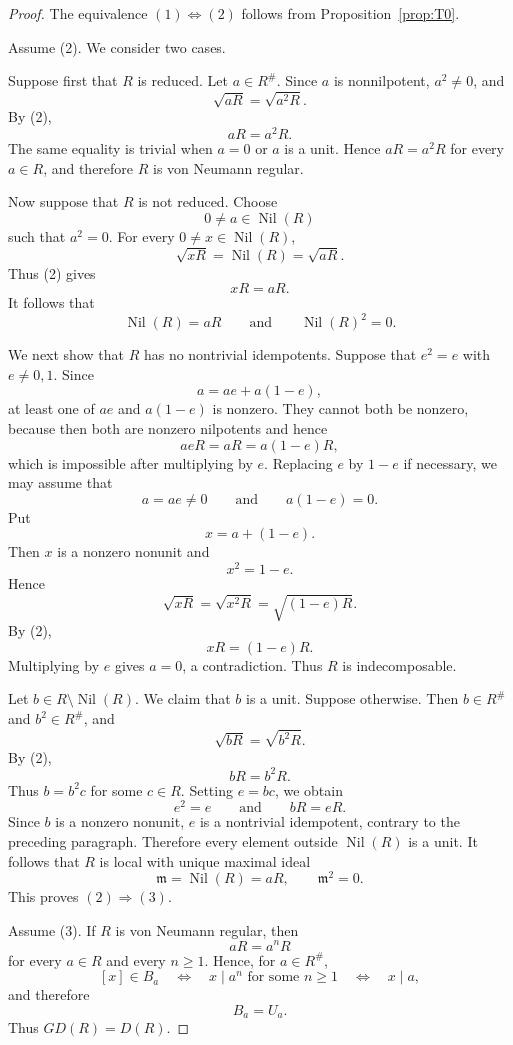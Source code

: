 \documentclass[11pt]{amsart}
\theoremstyle{plain}
\theoremstyle{definition}
\theoremstyle{remark}
\numberwithin{equation}{section}
\begin{document}
\begin{proof}
	The equivalence $(1)\Leftrightarrow(2)$ follows from
	Proposition~\ref{prop:T0}.
	
	Assume (2). We consider two cases.
	
	Suppose first that $R$ is reduced. Let $a\in R^\#$. Since $a$ is
	nonnilpotent, $a^2\neq0$, and
	\[
	\sqrt{aR}=\sqrt{a^2R}.
	\]
	By (2),
	\[
	aR=a^2R.
	\]
	The same equality is trivial when $a=0$ or $a$ is a unit. Hence
	$aR=a^2R$ for every $a\in R$, and therefore $R$ is von Neumann
	regular.
	
	Now suppose that $R$ is not reduced. Choose
	\[
	0\neq a\in\operatorname{Nil}(R)
	\]
	such that $a^2=0$. For every
	$0\neq x\in\operatorname{Nil}(R)$,
	\[
	\sqrt{xR}
	=
	\operatorname{Nil}(R)
	=
	\sqrt{aR}.
	\]
	Thus (2) gives
	\[
	xR=aR.
	\]
	It follows that
	\[
	\operatorname{Nil}(R)=aR
	\qquad\text{and}\qquad
	\operatorname{Nil}(R)^2=0.
	\]
	
	We next show that $R$ has no nontrivial idempotents. Suppose that
	$e^2=e$ with $e\neq0,1$. Since
	\[
	a=ae+a(1-e),
	\]
	at least one of $ae$ and $a(1-e)$ is nonzero. They cannot both be
	nonzero, because then both are nonzero nilpotents and hence
	\[
	aeR=aR=a(1-e)R,
	\]
	which is impossible after multiplying by $e$. Replacing $e$ by $1-e$
	if necessary, we may assume that
	\[
	a=ae\neq 0
	\qquad\text{and}\qquad
	a(1-e)=0.
	\]
	Put
	\[
	x=a+(1-e).
	\]
	Then $x$ is a nonzero nonunit and
	\[
	x^2=1-e.
	\]
	Hence
	\[
	\sqrt{xR}=\sqrt{x^2R}=\sqrt{(1-e)R}.
	\]
	By (2),
	\[
	xR=(1-e)R.
	\]
	Multiplying by $e$ gives $a=0$, a contradiction. Thus $R$ is
	indecomposable.
	
	Let $b\in R\setminus\operatorname{Nil}(R)$. We claim that $b$ is a
	unit. Suppose otherwise. Then $b\in R^\#$ and $b^2\in R^\#$, and
	\[
	\sqrt{bR}=\sqrt{b^2R}.
	\]
	By (2),
	\[
	bR=b^2R.
	\]
	Thus $b=b^2c$ for some $c\in R$. Setting $e=bc$, we obtain
	\[
	e^2=e
	\qquad\text{and}\qquad
	bR=eR.
	\]
	Since $b$ is a nonzero nonunit, $e$ is a nontrivial idempotent,
	contrary to the preceding paragraph. Therefore every element outside
	$\operatorname{Nil}(R)$ is a unit. It follows that $R$ is local with
	unique maximal ideal
	\[
	\mathfrak m=\operatorname{Nil}(R)=aR,
	\qquad
	\mathfrak m^2=0.
	\]
	This proves $(2)\Rightarrow(3)$.
	
	Assume (3). If $R$ is von Neumann regular, then
	\[
	aR=a^nR
	\]
	for every $a\in R$ and every $n\geq1$. Hence, for $a\in R^\#$,
	\[
	[x]\in B_a
	\quad\Longleftrightarrow\quad
	x\mid a^n\text{ for some }n\geq1
	\quad\Longleftrightarrow\quad
	x\mid a,
	\]
	and therefore
	\[
	B_a=U_a.
	\]
	Thus $GD(R)=D(R)$.
	

\end{proof}
\end{document}
